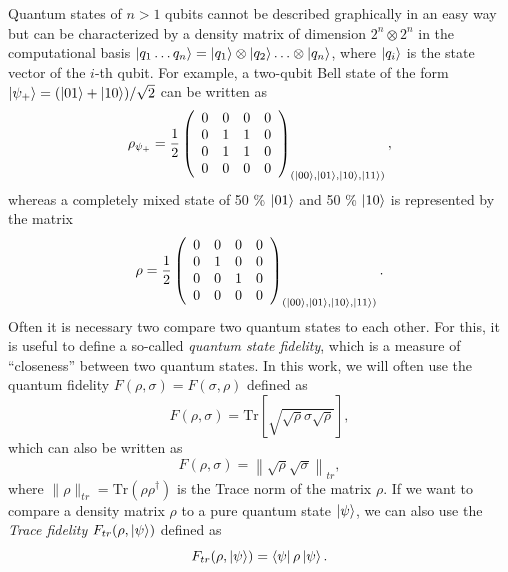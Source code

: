 \smallskip

Quantum states of $n>1$ qubits cannot be described graphically in an easy way but can be characterized by a density matrix of dimension $2^n\otimes 2^n$ in the computational basis $\left| q_1\hdots q_n \right>=\left| q_1 \right>\otimes\left| q_{2} \right>\hdots\otimes\left| q_n \right>$, where $\left| q_i \right>$ is the state vector of the $i$-th qubit. For example, a two-qubit Bell state of the form $\left| \psi_+ \right>=(\left| 01 \right>+\left| 10 \right>)/\sqrt{2}$ can be written as
%
\begin{equation}
\rho_{\psi_+} = \frac{1}{2}\left( \begin{array}{cccc} 0 & 0 & 0 & 0 \\ 0 & 1 & 1 & 0 \\ 0 & 1 & 1 & 0 \\ 0 & 0 & 0 & 0 \end{array} \right)_{(\left| 00 \right>,\left| 01 \right>,\left| 10 \right>,\left| 11 \right>)},
\end{equation}
%
whereas a completely mixed state of 50 \% $\left| 01 \right>$ and 50 \% $\left| 10 \right>$ is represented by the matrix
%
\begin{equation}
\rho = \frac{1}{2}\left( \begin{array}{cccc} 0 & 0 & 0 & 0 \\ 0 & 1 & 0 & 0 \\ 0 & 0 & 1 & 0 \\ 0 & 0 & 0 & 0 \end{array} \right)_{(\left| 00 \right>,\left| 01 \right>,\left| 10 \right>,\left| 11 \right>)}.
\end{equation}
%
Often it is necessary two compare two quantum states to each other. For this, it is useful to define a so-called {\it quantum state fidelity}, which is a measure of ``closeness'' between two quantum states. In this work, we will often use the quantum fidelity $F(\rho,\sigma)=F(\sigma,\rho)$ defined as
%
\begin{equation}
F(\rho,\sigma) = \mathrm{Tr}\left[\sqrt{\sqrt{\rho}\sigma\sqrt{\rho}}\right], \label{eq:quantum_state_fidelity}
\end{equation}
%
which can also be written as
%
\begin{equation}
F(\rho,\sigma) = \left\|\sqrt{\rho}\sqrt{\sigma}\right\|_{tr},
\end{equation}
%
where $\|\rho\|_{tr}=\mathrm{Tr}(\rho\rho^\dagger)$ is the Trace norm of the matrix $\rho$. If we want to compare a density matrix $\rho$ to a pure quantum state $\left| \psi \right>$, we can also use the {\it Trace fidelity} $F_{tr}(\rho,\left| \psi \right>)$ defined as
%
\begin{equation}
F_{tr}(\rho,\left| \psi \right>) = \left< \psi \right|\rho\left| \psi \right>. \label{eq:quantum_trace_fidelity}
\end{equation}
%
